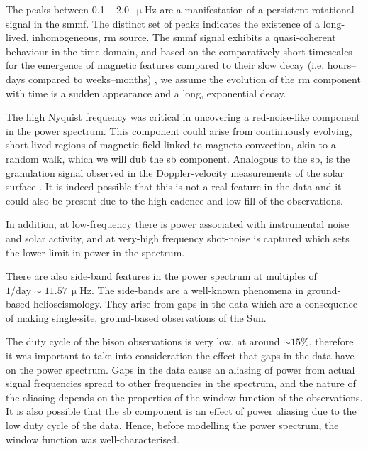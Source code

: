 The peaks between 0.1 -- 2.0~$\upmu\mathrm{Hz}$ are a manifestation of a persistent rotational signal in the \gls{smmf}. The distinct set of peaks indicates the existence of a long-lived, inhomogeneous, \gls{rm} source. The \gls{smmf} signal exhibits a quasi-coherent behaviour in the time domain, and based on the comparatively short timescales for the emergence of magnetic features compared to their slow decay (i.e. hours--days compared to weeks--months) \citep{zwaan_solar_1981, harvey_properties_1993, hathaway_sunspot_2008, dacie_evolution_2016}, we assume the evolution of the \gls{rm} component with time is a sudden appearance and a long, exponential decay.

The high Nyquist frequency was critical in uncovering a red-noise-like component in the power spectrum. This component could arise from continuously evolving, short-lived regions of magnetic field linked to magneto-convection, akin to a random walk, which we will dub the \gls{sb} component. Analogous to the \gls{sb}, is the granulation signal observed in the Doppler-velocity measurements of the solar surface \citep{basu_asteroseismic_2017}. It is indeed possible that this is not a real feature in the data and it could also be present due to the high-cadence and low-fill of the observations.

In addition, at low-frequency there is power associated with instrumental noise and solar activity, and at very-high frequency shot-noise is captured which sets the lower limit in power in the spectrum. 

There are also side-band features in the power spectrum at multiples of $1/\mathrm{day} \sim 11.57 \, \upmu\mathrm{Hz}$. The side-bands are a well-known phenomena in ground-based helioseismology. They arise from gaps in the data which are a consequence of making single-site, ground-based observations of the Sun.

The duty cycle of the \gls{bison} observations is very low, at around $\sim 15\%$, therefore it was important to take into consideration the effect that gaps in the data have on the power spectrum. Gaps in the data cause an aliasing of power from actual signal frequencies spread to other frequencies in the spectrum, and the nature of the aliasing depends on the properties of the window function of the observations. It is also possible that the \gls{sb} component is an effect of power aliasing due to the low duty cycle of the data. Hence, before modelling the power spectrum, the window function was well-characterised.


